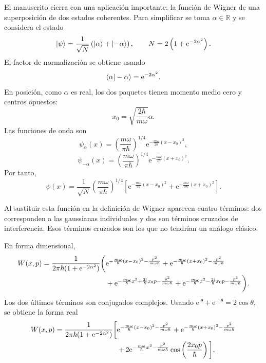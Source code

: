 \documentclass[11pt]{article}
\newcommand{\ii}{\mathrm{i}}
\newcommand{\ee}{\mathrm{e}}
\begin{document}
El manuscrito cierra con una aplicaci\'on importante: la funci\'on de Wigner de
una superposici\'on de dos estados coherentes. Para simplificar se toma
$\alpha\in\mathbb R$ y se considera el estado
\begin{equation}
  \ket{\psi}
  =
  \frac{1}{\sqrt N}
  \left(\ket{\alpha}+\ket{-\alpha}\right),
  \qquad
  N=2\left(1+\ee^{-2\alpha^2}\right).
\end{equation}
El factor de normalizaci\'on se obtiene usando
\begin{equation}
  \braket{\alpha|-\alpha}
  =
  \ee^{-2\alpha^2}.
\end{equation}
En posici\'on, como $\alpha$ es real, los dos paquetes tienen momento medio
cero y centros opuestos:
\begin{equation}
  x_0=\sqrt{\frac{2\hbar}{m\omega}}\alpha.
\end{equation}
Las funciones de onda son
\begin{equation}
  \psi_\alpha(x)
  =
  \left(\frac{m\omega}{\pi\hbar}\right)^{1/4}
  \ee^{-\frac{m\omega}{2\hbar}(x-x_0)^2},
\end{equation}
\begin{equation}
  \psi_{-\alpha}(x)
  =
  \left(\frac{m\omega}{\pi\hbar}\right)^{1/4}
  \ee^{-\frac{m\omega}{2\hbar}(x+x_0)^2}.
\end{equation}
Por tanto,
\begin{equation}
  \psi(x)
  =
  \frac{1}{\sqrt N}
  \left(\frac{m\omega}{\pi\hbar}\right)^{1/4}
  \left[
  \ee^{-\frac{m\omega}{2\hbar}(x-x_0)^2}
  +
  \ee^{-\frac{m\omega}{2\hbar}(x+x_0)^2}
  \right].
\end{equation}

Al sustituir esta funci\'on en la definici\'on de Wigner aparecen cuatro
t\'erminos: dos corresponden a las gaussianas individuales y dos son t\'erminos
cruzados de interferencia. Esos t\'erminos cruzados son los que no tendr\'ian
un an\'alogo cl\'asico.

En forma dimensional,
\begin{align}
  W(x,p)
  =
  \frac{1}{2\pi\hbar(1+\ee^{-2\alpha^2})}
  \bigg(
  &\ee^{-\frac{m\omega}{\hbar}(x-x_0)^2-\frac{p^2}{m\omega\hbar}}
  +\ee^{-\frac{m\omega}{\hbar}(x+x_0)^2-\frac{p^2}{m\omega\hbar}}
  \notag\\
  &+\ee^{-\frac{m\omega}{\hbar}x^2+\frac{2\ii}{\hbar}x_0p-\frac{p^2}{m\omega\hbar}}
  +\ee^{-\frac{m\omega}{\hbar}x^2-\frac{2\ii}{\hbar}x_0p-\frac{p^2}{m\omega\hbar}}
  \bigg).
\end{align}
Los dos \'ultimos t\'erminos son conjugados complejos. Usando
$\ee^{\ii\theta}+\ee^{-\ii\theta}=2\cos\theta$, se obtiene la forma real
\begin{align}
  W(x,p)
  =
  \frac{1}{2\pi\hbar(1+\ee^{-2\alpha^2})}
  \bigg[
  &\ee^{-\frac{m\omega}{\hbar}(x-x_0)^2-\frac{p^2}{m\omega\hbar}}
  +\ee^{-\frac{m\omega}{\hbar}(x+x_0)^2-\frac{p^2}{m\omega\hbar}}
  \notag\\
  &+2\ee^{-\frac{m\omega}{\hbar}x^2-\frac{p^2}{m\omega\hbar}}
  \cos\left(\frac{2x_0p}{\hbar}\right)
  \bigg].
\end{align}
\end{document}
